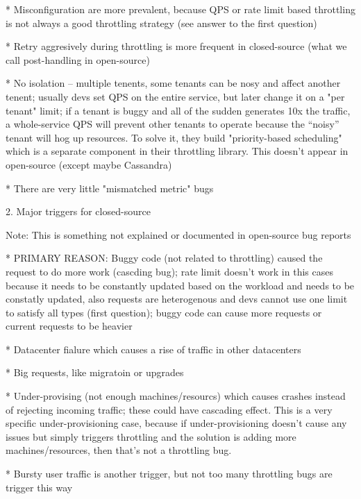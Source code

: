 * Misconfiguration are more prevalent, because QPS or rate limit based throttling is not always a good throttling strategy (see answer to the first question)

* Retry aggresively during throttling is more frequent in closed-source (what we call post-handling in open-source)

* No isolation -- multiple tenents, some tenants can be nosy and affect another tenent; usually devs set QPS on the entire service, but later change it on a "per tenant" limit; if a tenant is buggy and all of the sudden generates 10x the traffic, a whole-service QPS will prevent other tenants to operate because the ``noisy'' tenant will hog up resources. To solve it, they build "priority-based scheduling" which is a separate component in their throttling library. This doesn't appear in open-source (except maybe Cassandra)

* There are very little "mismatched metric" bugs

2. Major triggers for closed-source

Note: This is something not explained or documented in open-source bug reports 

* PRIMARY REASON: Buggy code (not related to throttling) caused the request to do more work (cascding bug); rate limit doesn't work in this cases because it needs to be constantly updated based on the workload and needs to be constatly updated, also requests are heterogenous and devs cannot use one limit to satisfy all types (first question); buggy code can cause more requests or current requests to be heavier

* Datacenter fialure which causes a rise of traffic in other datacenters

* Big requests, like migratoin or upgrades

* Under-provising (not enough machines/resourcs) which causes crashes instead of rejecting incoming traffic; these could have cascading effect. This is a very specific under-provisioning case, because if under-provisioning doesn't cause any issues but simply triggers throttling and the solution is adding more machines/resources, then that's not a throttling bug.

* Bursty user traffic is another trigger, but not too many throttling bugs are trigger this way 
